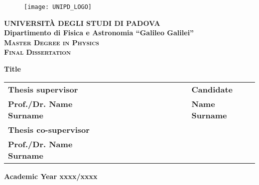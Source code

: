 \begin{titlepage}
\vspace{5mm}
\begin{figure}[hbtp]
\centering
\texttt{[image: UNIPD\_LOGO]}
\end{figure}
\vspace{5mm}
\begin{center}
{{\huge{\textsc{\bf UNIVERSIT\`A DEGLI STUDI DI PADOVA}}}\\}
\vspace{5mm}
{\Large{\bf Dipartimento di Fisica e Astronomia ``Galileo Galilei''}} \\
\vspace{5mm}
{\Large{\textsc{\bf Master Degree in Physics}}}\\
\vspace{20mm}
{\Large{\textsc{\bf Final Dissertation}}}\\
\vspace{30mm}
\begin{spacing}{3}
{\LARGE \textbf{Title}}\\
\end{spacing}
\vspace{8mm}
\end{center}

\vspace{20mm}
\begin{spacing}{2}
\begin{tabular}{ l  c  c c c  cc c c c c  l }
{\Large{\bf Thesis supervisor}} &&&&&&&&&&& {\Large{\bf Candidate}}\\
{\Large{\bf Prof./Dr. Name Surname}} &&&&&&&&&&& {\Large{\bf Name Surname}}\\
{\Large{\bf Thesis co-supervisor}}\\
{\Large{\bf Prof./Dr. Name Surname}}\\
\end{tabular}
\end{spacing}
\vspace{15 mm}

\begin{center}
{\Large{\bf Academic Year xxxx/xxxx}}
\end{center}
\end{titlepage}
